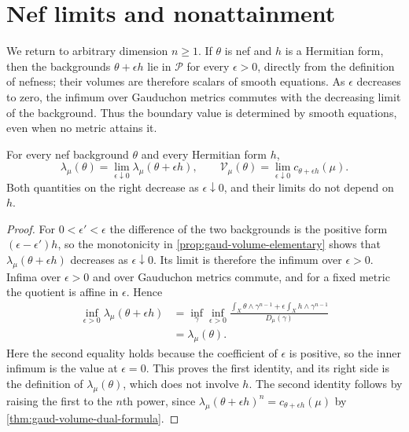 



\section{Nef limits and nonattainment}
\label{sec:gaud-volume-nef-limit}

We return to arbitrary dimension $n\geq1$. If $\theta$ is nef and $h$ is a Hermitian form, then the backgrounds $\theta+\epsilon h$ lie in $\mathscr P$ for every $\epsilon>0$, directly from the definition of nefness; their volumes are therefore scalars of smooth equations. As $\epsilon$ decreases to zero, the infimum over Gauduchon metrics commutes with the decreasing limit of the background. Thus the boundary value is determined by smooth equations, even when no metric attains it.

\begin{theorem}\label{thm:gaud-volume-nef-limit}
For every nef background $\theta$ and every Hermitian form $h$,
\[
 \lambda_\mu(\theta)
     =\lim_{\epsilon\downarrow0}\lambda_\mu(\theta+\epsilon h),
 \qquad
 \mathcal V_\mu(\theta)
     =\lim_{\epsilon\downarrow0}c_{\theta+\epsilon h}(\mu).
\]
Both quantities on the right decrease as $\epsilon\downarrow0$, and their limits do not depend on $h$.
\end{theorem}
\begin{proof}
For $0<\epsilon'<\epsilon$ the difference of the two backgrounds is the positive form $(\epsilon-\epsilon')h$, so the monotonicity in \cref{prop:gaud-volume-elementary} shows that $\lambda_\mu(\theta+\epsilon h)$ decreases as $\epsilon\downarrow0$. Its limit is therefore the infimum over $\epsilon>0$. Infima over $\epsilon>0$ and over Gauduchon metrics commute, and for a fixed metric the quotient is affine in $\epsilon$. Hence
\[
 \begin{split}
 \inf_{\epsilon>0}\lambda_\mu(\theta+\epsilon h)
 &=\inf_\gamma\inf_{\epsilon>0}
   \frac{\int_X\theta\wedge\gamma^{n-1}
                +\epsilon\int_Xh\wedge\gamma^{n-1}}
        {D_\mu(\gamma)}\\
 &=\lambda_\mu(\theta).
 \end{split}
\]
Here the second equality holds because the coefficient of $\epsilon$ is positive, so the inner infimum is the value at $\epsilon=0$. This proves the first identity, and its right side is the definition of $\lambda_\mu(\theta)$, which does not involve $h$. The second identity follows by raising the first to the $n$th power, since $\lambda_\mu(\theta+\epsilon h)^n=c_{\theta+\epsilon h}(\mu)$ by \cref{thm:gaud-volume-dual-formula}.
\end{proof}


